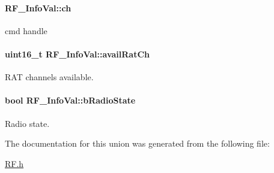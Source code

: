 \paragraph[{ch}]{ R\+F\+\_\+\+Info\+Val\+::ch}\label{union_r_f___info_val_a19bf3d8f9d5a9d3b3ec34fd6238f6564}


cmd handle 

\paragraph[{avail\+Rat\+Ch}]{\setlength{\rightskip}{0pt plus 5cm}uint16\+\_\+t R\+F\+\_\+\+Info\+Val\+::avail\+Rat\+Ch}\label{union_r_f___info_val_ae380eea33c0f34396c006a85e97baa71}


R\+A\+T channels available. 

\paragraph[{b\+Radio\+State}]{\setlength{\rightskip}{0pt plus 5cm}bool R\+F\+\_\+\+Info\+Val\+::b\+Radio\+State}\label{union_r_f___info_val_ae8142037b3833868a4e6b7498c4a631c}


Radio state. 



The documentation for this union was generated from the following file\+:\begin{DoxyCompactItemize}
\item 
\hyperlink{_r_f_8h}{R\+F.\+h}\end{DoxyCompactItemize}
